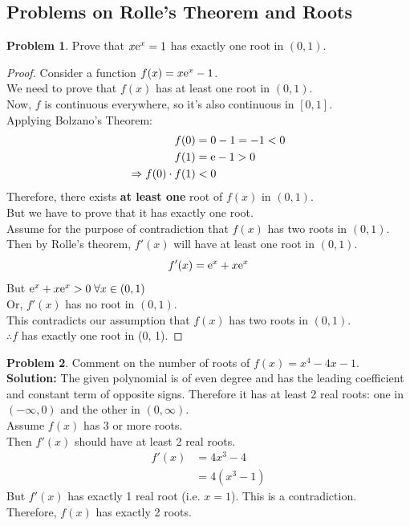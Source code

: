 \documentclass[14]{article}
\theoremstyle{definition}
\newtheorem{prob}{Problem}
\theoremstyle{case}
\begin{document}
\subsection{Problems on Rolle's Theorem and Roots}
\begin{prob}
Prove that $x {\rm e}^x = 1$ has exactly one root in $(0, 1)$.
\begin{proof}
Consider a function $f(x) = x {\rm e}^x - 1$.\\
We need to prove that $f(x)$ has at least one root in $(0, 1)$.\\
Now, $f$ is continuous everywhere, so it's also continuous in $[0, 1]$.\\
Applying Bolzano's Theorem:
\begin{align*}
f(0) &= 0 - 1 = -1 < 0\\
f(1) &= {\rm e} - 1 > 0\\
\Rightarrow f(0) \cdot f(1) &< 0
\end{align*}
Therefore, there exists \textbf{at least one} root of $f(x)$ in $(0, 1)$.\\
But we have to prove that it has exactly one root.\\
Assume for the purpose of contradiction that $f(x)$ has two roots in $(0, 1)$.\\
Then by Rolle's theorem, $f'(x)$ will have at least one root in $(0, 1)$.\\
\begin{equation*}
f'(x) = {\rm e} ^ x + x {\rm e}^x
\end{equation*}
But ${\rm e} ^ x + x {\rm e}^x > 0 \; \forall x \in (0, 1)$\\
Or, $f'(x)$ has no root in $(0, 1)$.\\ This contradicts our assumption that $f(x)$ has two roots in $(0, 1)$.\\
$\therefore f$ has exactly one root in (0, 1). 
\end{proof}
\end{prob}
\begin{prob}
Comment on the number of roots of $f(x) = x^4- 4x - 1$.\\
\textbf{Solution: } The given polynomial is of even degree and has the leading coefficient and constant term of opposite signs. Therefore it has at least 2 real roots: one in $(-\infty, 0)$ and the other in $(0, \infty)$.\\
Assume $f(x)$ has 3 or more roots.\\
Then $f'(x)$ should have at least 2 real roots.\\
\begin{align*}
f'(x) &= 4x^3 - 4\\
&= 4(x^3 - 1)
\end{align*}
But $f'(x)$ has exactly 1 real root (i.e. $x = 1$). This is a contradiction.\\
Therefore, $f(x)$ has exactly 2 roots.
\end{prob}
\end{document}
